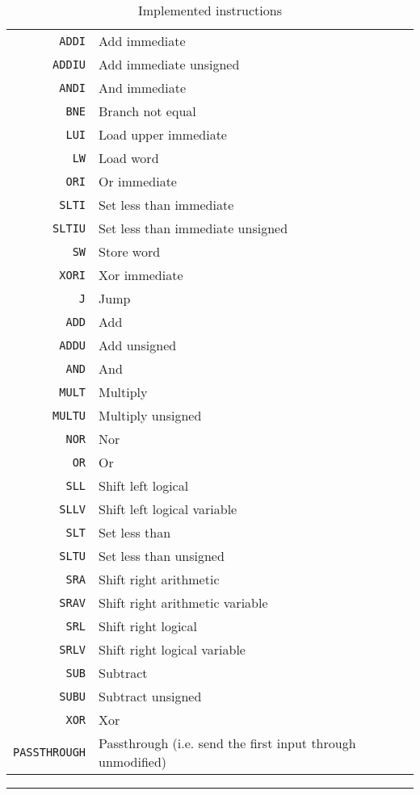 \begin{table}
    \begin{tabular}{r|l}
        \texttt{ADDI} & Add immediate \\
        \texttt{ADDIU} & Add immediate unsigned \\
        \texttt{ANDI} & And immediate \\
        \texttt{BNE} & Branch not equal \\
        \texttt{LUI} & Load upper immediate \\
        \texttt{LW} & Load word \\
        \texttt{ORI} & Or immediate \\
        \texttt{SLTI} & Set less than immediate \\
        \texttt{SLTIU} & Set less than immediate unsigned \\
        \texttt{SW} & Store word \\
        \texttt{XORI} & Xor immediate \\
        \texttt{J} & Jump \\
        \texttt{ADD} & Add \\
        \texttt{ADDU} & Add unsigned \\
        \texttt{AND} & And \\
        \texttt{MULT} & Multiply \\
        \texttt{MULTU} & Multiply unsigned \\
        \texttt{NOR} & Nor \\
        \texttt{OR} & Or \\
        \texttt{SLL} & Shift left logical \\
        \texttt{SLLV} & Shift left logical variable \\
        \texttt{SLT} & Set less than \\
        \texttt{SLTU} & Set less than unsigned \\
        \texttt{SRA} & Shift right arithmetic \\
        \texttt{SRAV} & Shift right arithmetic variable \\
        \texttt{SRL} & Shift right logical \\
        \texttt{SRLV} & Shift right logical variable \\
        \texttt{SUB} & Subtract \\
        \texttt{SUBU} & Subtract unsigned \\
        \texttt{XOR} & Xor \\
        \texttt{PASSTHROUGH} & Passthrough (i.e. send the first input through unmodified) \\
    \end{tabular}
    \smallskip
    \hrule
    \smallskip
    \caption{Implemented instructions}
    \label{table:implemented-instructions}
\end{table}
